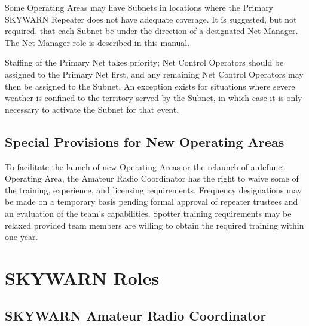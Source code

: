 \documentclass[pdflatex,letterpaper,twoside,12pt]{book}
\begin{document}
Some Operating Areas may have Subnets in locations where the Primary SKYWARN Repeater does not have adequate coverage.  It is suggested, but not required, that each Subnet be under the direction of a designated Net Manager. The Net Manager role is described in this manual. 

Staffing of the Primary Net takes priority;  Net Control Operators should be assigned to the Primary Net first, and any remaining Net Control Operators may then be assigned to the Subnet.  An exception exists for situations where severe weather is confined to the territory served by the Subnet, in which case it is only necessary to activate the Subnet for that event.


\section{Special Provisions for New Operating Areas}

To facilitate the launch of new Operating Areas or the relaunch of a defunct Operating Area, the Amateur Radio Coordinator has the right to waive some of the training, experience, and licensing requirements.  Frequency designations may be made on a temporary basis pending formal approval of repeater trustees and an evaluation of the team's capabilities.  Spotter training requirements may be relaxed provided team members are willing to obtain the required training within one year.


\chapter{SKYWARN Roles}\label{skywarn-roles}


\section{SKYWARN Amateur Radio Coordinator}
\end{document}
